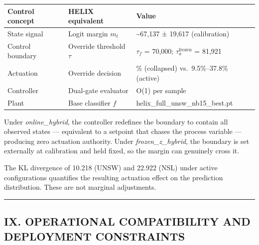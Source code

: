 \documentclass[
  conference]{IEEEtran}
\newcounter{none} %
\begin{document}
{\def\LTcaptype{none} %
\begin{longtable}[]{@{}
  >{\raggedright\arraybackslash}p{}
  >{\raggedright\arraybackslash}p{}
  >{\raggedright\arraybackslash}p{}@{}}
\toprule\noalign{}
\begin{minipage}[b]{\linewidth}\raggedright
Control concept
\end{minipage} & \begin{minipage}[b]{\linewidth}\raggedright
HELIX equivalent
\end{minipage} & \begin{minipage}[b]{\linewidth}\raggedright
Value
\end{minipage} \\
\midrule\noalign{}
\endhead
\bottomrule\noalign{}
\endlastfoot
State signal & Logit margin \(m_t\) & \textasciitilde67,137 ± 19,617
(calibration) \\
Control boundary & Override threshold \(\tau\) & \(\tau_f\) = 70,000;
\(\tau_a^{\text{frozen}}\) = 81,921 \\
Actuation & Override decision & 0\% (collapsed) vs.~9.5\%--37.8\%
(active) \\
Controller & Dual-gate evaluator & O(1) per sample \\
Plant & Base classifier \(f\) & helix\_full\_unsw\_nb15\_best.pt \\
\end{longtable}
}

Under \emph{online\_hybrid}, the controller redefines the boundary to
contain all observed states --- equivalent to a setpoint that chases the
process variable --- producing zero actuation authority. Under
\emph{frozen\_z\_hybrid}, the boundary is set externally at calibration
and held fixed, so the margin can genuinely cross it.

The KL divergence of 10.218 (UNSW) and 22.922 (NSL) under active
configurations quantifies the resulting actuation effect on the
prediction distribution. These are not marginal adjustments.

\begin{center}\rule{0.5\linewidth}{0.5pt}\end{center}

\subsection{IX. OPERATIONAL COMPATIBILITY AND DEPLOYMENT
CONSTRAINTS}\label{ix.-operational-compatibility-and-deployment-constraints}
\end{document}
